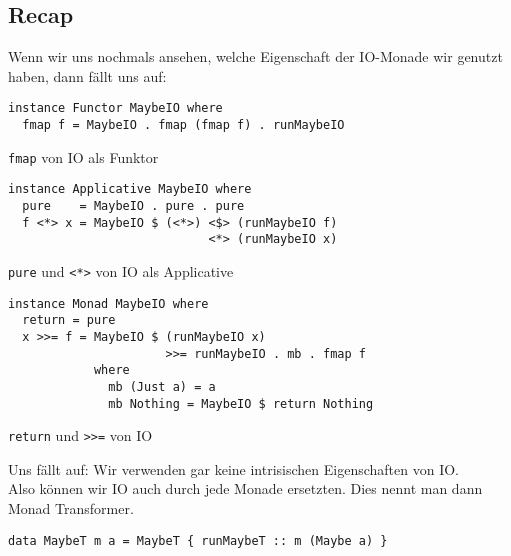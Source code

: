 \documentclass{beamer}
\begin{document}
\subsection{Recap}

\begin{frame}[fragile]
Wenn wir uns nochmals ansehen, welche Eigenschaft der IO-Monade wir genutzt haben, dann fällt uns auf:
\pause
\begin{verbatim}
instance Functor MaybeIO where
  fmap f = MaybeIO . fmap (fmap f) . runMaybeIO
\end{verbatim}
\texttt{fmap} von IO als Funktor
\pause
\begin{verbatim}
instance Applicative MaybeIO where
  pure    = MaybeIO . pure . pure
  f <*> x = MaybeIO $ (<*>) <$> (runMaybeIO f)
                            <*> (runMaybeIO x)
\end{verbatim}
\texttt{pure} und \texttt{<*>} von IO als Applicative
\pause
\begin{verbatim}
instance Monad MaybeIO where
  return = pure
  x >>= f = MaybeIO $ (runMaybeIO x)
                      >>= runMaybeIO . mb . fmap f
            where
              mb (Just a) = a
              mb Nothing = MaybeIO $ return Nothing
\end{verbatim}
\texttt{return} und \texttt{>>=} von IO
\end{frame}

\begin{frame}[fragile]
Uns fällt auf: Wir verwenden gar keine intrisischen Eigenschaften von IO.\\
Also können wir IO auch durch jede Monade ersetzten. Dies nennt man dann Monad Transformer.
\begin{verbatim}
data MaybeT m a = MaybeT { runMaybeT :: m (Maybe a) }
\end{verbatim}
\end{frame}
\end{document}

